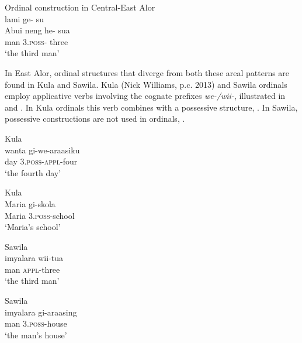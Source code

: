 \ea%
\label{bkm:Ref342309284}
{\upshape Ordinal construction in Central-East Alor}\\ 
   lami  ge- su \\  
    {\upshape Abui}     neng  he-  sua   \\
    { }  man  3\textsc{.poss-}  three\\
\glt  `the third man'
\z 



\let\eachwordone=\itshape
\let\eachwordtwo=\upshape 

In East Alor, ordinal structures that diverge from both these areal patterns are found in Kula and Sawila. Kula (Nick Williams, p.c. 2013) and Sawila ordinals employ applicative verbs involving the cognate prefixes \textit{we-/wii-}, illustrated in  and . In Kula ordinals this verb combines with a possessive structure, . In Sawila, possessive constructions  are not used in ordinals, . 


\ea%
\label{bkm:Ref355275027}
 
{\upshape Kula}\\
\gll wanta   gi-we-araasiku\\  
  day   3.\textsc{poss}{}-\textsc{appl}{}-four  \\
\glt  `the fourth day'
\z
 

\ea%
\label{bkm:Ref358037937}
{\upshape Kula}\\
\gll Maria   gi-skola\\  
   Maria   3.\textsc{poss-}school \\
\glt`Maria's school'
\z
 
  

  


\ea%
\label{bkm:Ref355277550}
{\upshape Sawila}\\
\gll   imyalara   wii-tua\\  
   man    \textsc{appl-}three \\
\glt  `the third man'
\z

  

  




\ea%
\label{bkm:Ref342737790}
{\upshape Sawila}\\
\gll imyalara   gi-araasing \\  
    man    3.\textsc{poss}-house   \\
\glt`the man's house'
\z
 


